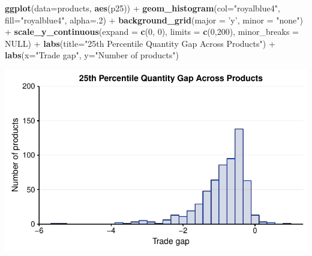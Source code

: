 \documentclass[10pt,]{article}
\newenvironment{Shaded}{\begin{snugshade}}{\end{snugshade}}
\newcommand{\KeywordTok}[1]{\textcolor[rgb]{0.13,0.29,0.53}{\textbf{{#1}}}}
\newcommand{\DataTypeTok}[1]{\textcolor[rgb]{0.13,0.29,0.53}{{#1}}}
\newcommand{\DecValTok}[1]{\textcolor[rgb]{0.00,0.00,0.81}{{#1}}}
\newcommand{\StringTok}[1]{\textcolor[rgb]{0.31,0.60,0.02}{{#1}}}
\newcommand{\OtherTok}[1]{\textcolor[rgb]{0.56,0.35,0.01}{{#1}}}
\newcommand{\NormalTok}[1]{{#1}}
\begin{document}
\begin{Shaded}
\begin{Highlighting}[]
\KeywordTok{ggplot}\NormalTok{(}\DataTypeTok{data=}\NormalTok{products, }\KeywordTok{aes}\NormalTok{(p25)) +}
\StringTok{  }\KeywordTok{geom_histogram}\NormalTok{(}\DataTypeTok{col=}\StringTok{"royalblue4"}\NormalTok{,}
                 \DataTypeTok{fill=}\StringTok{"royalblue4"}\NormalTok{,}
                 \DataTypeTok{alpha=}\NormalTok{.}\DecValTok{2}\NormalTok{) +}
\StringTok{  }\KeywordTok{background_grid}\NormalTok{(}\DataTypeTok{major =} \StringTok{'y'}\NormalTok{, }\DataTypeTok{minor =} \StringTok{"none"}\NormalTok{) +}
\StringTok{  }\KeywordTok{scale_y_continuous}\NormalTok{(}\DataTypeTok{expand =} \KeywordTok{c}\NormalTok{(}\DecValTok{0}\NormalTok{, }\DecValTok{0}\NormalTok{), }\DataTypeTok{limits =} \KeywordTok{c}\NormalTok{(}\DecValTok{0}\NormalTok{,}\DecValTok{200}\NormalTok{), }\DataTypeTok{minor_breaks =} \OtherTok{NULL}\NormalTok{) +}
\StringTok{  }\KeywordTok{labs}\NormalTok{(}\DataTypeTok{title=}\StringTok{"25th Percentile Quantity Gap Across Products"}\NormalTok{) +}
\StringTok{  }\KeywordTok{labs}\NormalTok{(}\DataTypeTok{x=}\StringTok{"Trade gap"}\NormalTok{, }\DataTypeTok{y=}\StringTok{"Number of products"}\NormalTok{)}
\end{Highlighting}
\end{Shaded}

\begin{center}\includegraphics{Figs/quantity_products-3} \end{center}
\end{document}

